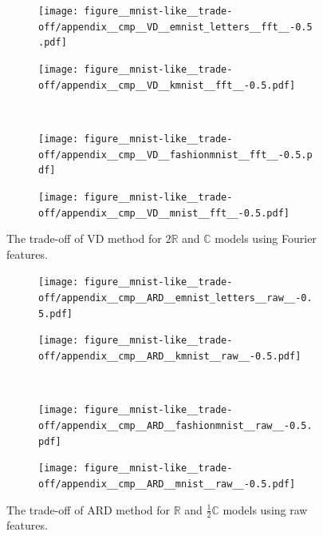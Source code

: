 \documentclass[a4paper]{extarticle}
\newcommand{\real}{\mathbb{R}}
\newcommand{\cplx}{\mathbb{C}}
\begin{document}
\begin{figure}[ht]
  \centering
  \begin{subfigure}[b]{0.5\textwidth}
    \centering
    \texttt{[image: figure\_\_mnist-like\_\_trade-off/appendix\_\_cmp\_\_VD\_\_emnist\_letters\_\_fft\_\_-0.5.pdf]}
  \end{subfigure}%
  \begin{subfigure}[b]{0.5\textwidth}
    \centering
    \texttt{[image: figure\_\_mnist-like\_\_trade-off/appendix\_\_cmp\_\_VD\_\_kmnist\_\_fft\_\_-0.5.pdf]}
  \end{subfigure} \\ %
  \begin{subfigure}[b]{0.5\textwidth}
    \centering
    \texttt{[image: figure\_\_mnist-like\_\_trade-off/appendix\_\_cmp\_\_VD\_\_fashionmnist\_\_fft\_\_-0.5.pdf]}
  \end{subfigure}%
  \begin{subfigure}[b]{0.5\textwidth}
    \centering
    \texttt{[image: figure\_\_mnist-like\_\_trade-off/appendix\_\_cmp\_\_VD\_\_mnist\_\_fft\_\_-0.5.pdf]}
  \end{subfigure}
  \caption{%
    The trade-off of VD method for $2\real$ and $\cplx$ models using Fourier features.
  }
  \label{fig:appendix__cmp__mnist-like__trade-off__VD__fft}
\end{figure}

\begin{figure}[ht]
  \centering
  \begin{subfigure}[b]{0.5\textwidth}
    \centering
    \texttt{[image: figure\_\_mnist-like\_\_trade-off/appendix\_\_cmp\_\_ARD\_\_emnist\_letters\_\_raw\_\_-0.5.pdf]}
  \end{subfigure}%
  \begin{subfigure}[b]{0.5\textwidth}
    \centering
    \texttt{[image: figure\_\_mnist-like\_\_trade-off/appendix\_\_cmp\_\_ARD\_\_kmnist\_\_raw\_\_-0.5.pdf]}
  \end{subfigure} \\%
  \begin{subfigure}[b]{0.5\textwidth}
    \centering
    \texttt{[image: figure\_\_mnist-like\_\_trade-off/appendix\_\_cmp\_\_ARD\_\_fashionmnist\_\_raw\_\_-0.5.pdf]}
  \end{subfigure}%
  \begin{subfigure}[b]{0.5\textwidth}
    \centering
    \texttt{[image: figure\_\_mnist-like\_\_trade-off/appendix\_\_cmp\_\_ARD\_\_mnist\_\_raw\_\_-0.5.pdf]}
  \end{subfigure}
  \caption{%
    The trade-off of ARD method for $\real$ and $\tfrac12\cplx$ models using raw features.
  }
  \label{fig:appendix__cmp__mnist-like__trade-off__ARD__raw}
\end{figure}
\end{document}
